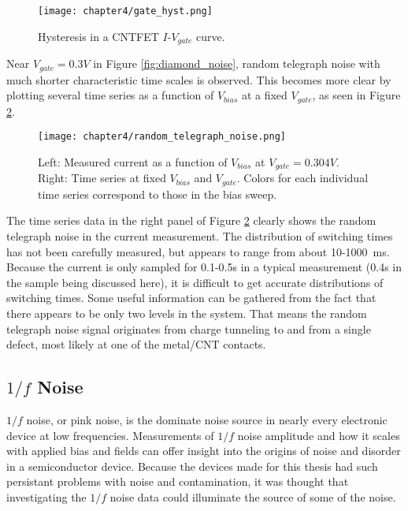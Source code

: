 \begin{figure}
    \centering
    \texttt{[image: chapter4/gate\_hyst.png]}
    \caption{Hysteresis in a CNTFET $I$-$V_{gate}$ curve.}
    \label{fig:gate_hyst}
\end{figure}

Near $V_{gate} = 0.3V$ in Figure \ref{fig:diamond_noise}, random telegraph noise with much shorter characteristic time scales is observed. This becomes more clear by plotting several time series as a function of $V_{bias}$ at a fixed $V_{gate}$, as seen in Figure \ref{fig:rts_bias}.

\begin{figure}
    \centering
    \texttt{[image: chapter4/random\_telegraph\_noise.png]}
    \caption{Left: Measured current as a function of $V_{bias}$ at $V_{gate} = 0.304V$. Right: Time series at fixed $V_{bias}$ and $V_{gate}$. Colors for each individual time series correspond to those in the bias sweep.}
    \label{fig:rts_bias}
\end{figure}

The time series data in the right panel of Figure \ref{fig:rts_bias} clearly shows the random telegraph noise in the current measurement. The distribution of switching times has not been carefully measured, but appears to range from about 10-\SI{1000}{\milli\second}. Because the current is only sampled for 0.1-0.5s in a typical measurement (0.4s in the sample being discussed here), it is difficult to get accurate distributions of switching times. Some useful information can be gathered from the fact that there appears to be only two levels in the system. That means the random telegraph noise signal originates from charge tunneling to and from a single defect, most likely at one of the metal/CNT contacts. 

\subsection{$1/f$ Noise}

$1/f$ noise, or pink noise, is the dominate noise source in nearly every electronic device at low frequencies. Measurements of $1/f$ noise amplitude and how it scales with applied bias and fields can offer insight into the origins of noise and disorder in a semiconductor device. Because the devices made for this thesis had such persistant problems with noise and contamination, it was thought that investigating the $1/f$ noise data could illuminate the source of some of the noise.

